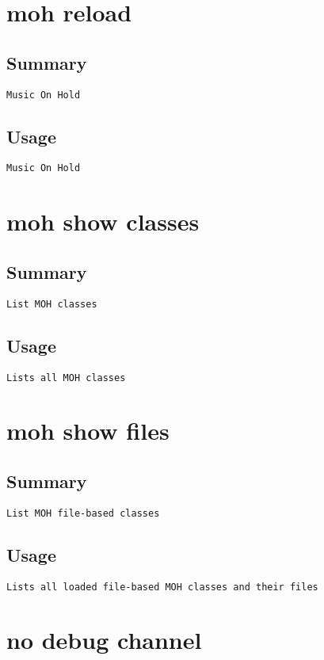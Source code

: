 \section{moh reload}
\subsection{Summary}
\begin{verbatim}
Music On Hold
\end{verbatim}
\subsection{Usage}
\begin{verbatim}
Music On Hold
\end{verbatim}


\section{moh show classes}
\subsection{Summary}
\begin{verbatim}
List MOH classes
\end{verbatim}
\subsection{Usage}
\begin{verbatim}
Lists all MOH classes
\end{verbatim}


\section{moh show files}
\subsection{Summary}
\begin{verbatim}
List MOH file-based classes
\end{verbatim}
\subsection{Usage}
\begin{verbatim}
Lists all loaded file-based MOH classes and their files
\end{verbatim}


\section{no debug channel}
